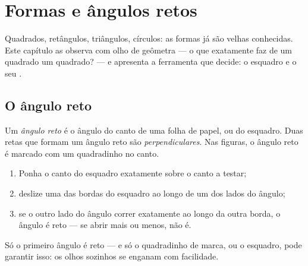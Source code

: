 \chapter{Formas e ângulos retos}\label{ch:g3:shapes}

Quadrados, retângulos, triângulos, círculos: as formas já são velhas
conhecidas. Este capítulo as observa com olho de geômetra --- o que
exatamente faz de um quadrado um quadrado? --- e apresenta a
ferramenta que decide: o esquadro e o seu .

\section{O ângulo reto}

\begin{definition}\label{def:g3:shapes:rightangle}
Um \emph{ângulo reto} é o ângulo do canto de uma
folha de papel, ou do esquadro. Duas retas que formam um ângulo reto
são \emph{perpendiculares}. Nas figuras, o ângulo reto é marcado com
um quadradinho no canto.
\end{definition}

\begin{method}\label{met:g3:shapes:check}
\begin{enumerate}
  \item Ponha o canto do esquadro exatamente sobre o canto a testar;
  \item deslize uma das bordas do esquadro ao longo de um dos lados
        do ângulo;
  \item se o outro lado do ângulo correr exatamente ao longo da outra
        borda, o ângulo é reto --- se abrir mais ou menos, não é.
\end{enumerate}
\end{method}

\begin{omfigure}

{\small Só o primeiro ângulo é reto --- e só o quadradinho de marca,
ou o esquadro, pode garantir isso: os olhos sozinhos se enganam com
facilidade.}
\end{omfigure}

